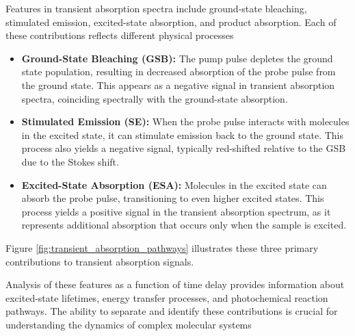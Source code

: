 \noindent Features in transient absorption spectra include ground-state bleaching, stimulated emission, excited-state absorption, and product absorption. Each of these contributions reflects different physical processes %

\begin{itemize}
	\item \textbf{Ground-State Bleaching (GSB):} The pump pulse depletes the ground state population, resulting in decreased absorption of the probe pulse from the ground state. This appears as a negative signal in transient absorption spectra, coinciding spectrally with the ground-state absorption.

	\item \textbf{Stimulated Emission (SE):} When the probe pulse interacts with molecules in the excited state, it can stimulate emission back to the ground state. This process also yields a negative signal, typically red-shifted relative to the GSB due to the Stokes shift.

	\item \textbf{Excited-State Absorption (ESA):} Molecules in the excited state can absorb the probe pulse, transitioning to even higher excited states. This process yields a positive signal in the transient absorption spectrum, as it represents additional absorption that occurs only when the sample is excited.
\end{itemize}


\noindent Figure \ref{fig:transient_absorption_pathways} illustrates these three primary contributions to transient absorption signals.

\noindent Analysis of these features as a function of time delay provides information about excited-state lifetimes, energy transfer processes, and photochemical reaction pathways. The ability to separate and identify these contributions is crucial for understanding the dynamics of complex molecular systems %

